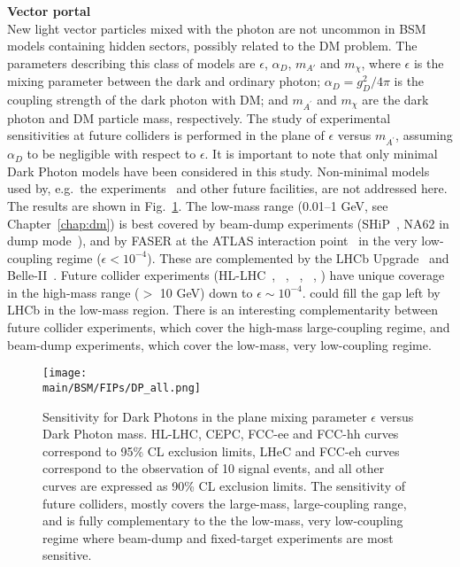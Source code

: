 \documentclass[../report.tex]{subfiles}
\providecommand{\main}{..}
\begin{document}
\noindent
{\bf Vector portal} \\
New light vector particles mixed with the photon are not uncommon in BSM models containing hidden sectors, possibly related to the DM problem.
The parameters describing this class of models are $\epsilon$, $\alpha_D$, $m_{A'}$ and $m_{\chi}$,
where $\epsilon$ is the mixing parameter between the dark and ordinary photon; $\alpha_D = g^2_D/ 4 \pi$ is the coupling strength of the dark photon with DM; and $m_{A^\prime}$ and $m_{\chi}$ are the dark photon and DM particle mass, respectively.
The study of experimental sensitivities at future colliders is performed in the plane of $\epsilon$ versus $m_{A^\prime}$,
assuming $\alpha_D$ to be negligible with respect to $\epsilon$.
It is important to note that only minimal Dark Photon models have been considered in this study. 
Non-minimal models used by, e.g.\ the \HLLHC experiments~\cite{CidVidal:2018eel} and other future facilities, are not addressed here.
The results are shown in Fig.~\ref{fig:FIPs-DarkPhoton}.
The low-mass range (0.01--1 GeV, see Chapter~\ref{chap:dm}) is best covered by beam-dump experiments (SHiP~\cite{Anelli:2015pba}, NA62 in dump mode~\cite{Lanfranchi:2018xrz}), and by FASER at the ATLAS interaction point~\cite{Ariga:2018pin} in the very low-coupling regime ($\epsilon < 10^{-4}$). These are complemented by the LHCb Upgrade~\cite{Ilten:2015hya} and Belle-II~\cite{Kou:2018nap}. Future collider experiments (HL-LHC~\cite{Curtin:2014cca}, \CEPC~\cite{CEPCStudyGroup:2018ghi}, \FCCee~\cite{Karliner:2015tga}, \FCChh~\cite{Curtin:2014cca}, {\ILCFiveHundred}) have unique coverage in the high-mass range ($>$ 10 GeV) down to $\epsilon \sim 10^{-4}$.  \FCCeh 
could fill the gap left by LHCb in the low-mass region. There is an interesting complementarity between future collider experiments, which cover the high-mass large-coupling regime, and beam-dump experiments, which cover the low-mass, very low-coupling regime.

\begin{figure}[htb]
    \centering
    \texttt{[image: \\main/BSM/FIPs/DP\_all.png]}
    \caption{Sensitivity for Dark Photons in the plane mixing parameter $\epsilon$ versus Dark Photon mass. HL-LHC, CEPC, FCC-ee and FCC-hh curves correspond to 95\% CL exclusion limits, LHeC and FCC-eh curves correspond to the observation of 10 signal events, and all other curves are expressed as 90\% CL exclusion limits. The sensitivity of future colliders, mostly covers the large-mass, large-coupling range, and is fully complementary to the the low-mass, very low-coupling regime where beam-dump and fixed-target experiments are most sensitive.
    }
    \label{fig:FIPs-DarkPhoton}
\end{figure}
\end{document}

